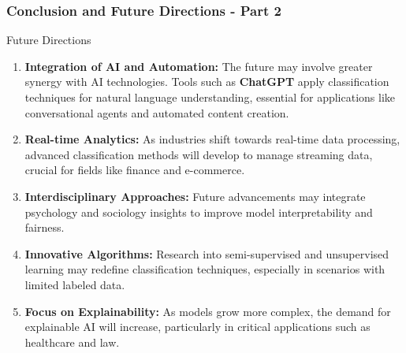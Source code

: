 \documentclass[aspectratio=169]{beamer}
\begin{document}
\begin{frame}[fragile]
    \frametitle{Conclusion and Future Directions - Part 2}
    \begin{block}{Future Directions}
        \begin{enumerate}
            \item \textbf{Integration of AI and Automation:} The future may involve greater synergy with AI technologies. Tools such as \textbf{ChatGPT} apply classification techniques for natural language understanding, essential for applications like conversational agents and automated content creation.
            
            \item \textbf{Real-time Analytics:} As industries shift towards real-time data processing, advanced classification methods will develop to manage streaming data, crucial for fields like finance and e-commerce.
            
            \item \textbf{Interdisciplinary Approaches:} Future advancements may integrate psychology and sociology insights to improve model interpretability and fairness.
            
            \item \textbf{Innovative Algorithms:} Research into semi-supervised and unsupervised learning may redefine classification techniques, especially in scenarios with limited labeled data.
            
            \item \textbf{Focus on Explainability:} As models grow more complex, the demand for explainable AI will increase, particularly in critical applications such as healthcare and law.
        \end{enumerate}
    \end{block}
\end{frame}
\end{document}
